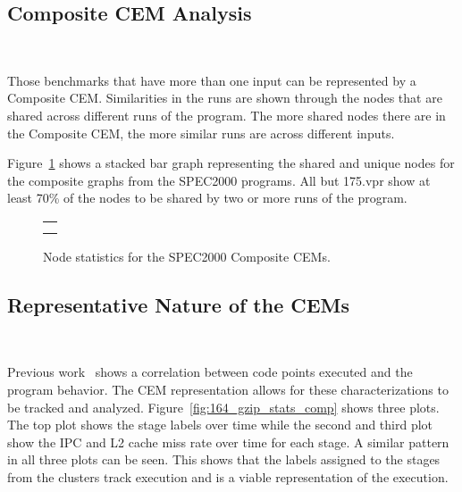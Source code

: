 \subsection{Composite CEM Analysis}~\label{sec:meth_composite_cem}

Those benchmarks that have more than one input can be represented by a
Composite CEM. Similarities in the runs are shown through the nodes
that are shared across different runs of the program. The more
shared nodes there are in the Composite CEM, the more similar runs are
across different inputs.

Figure~\ref{fig:2000_composite_nodes} shows a stacked bar graph
representing the shared and unique nodes for the composite graphs from
the SPEC2000 programs.  All but 175.vpr show at least 70\% of the
nodes to be shared by two or more runs of the program.

\begin{figure}[ht!]
    \begin{tabular}{c}
        \begin{minipage}{\textwidth}
            \centering
            \texttt{[image: fig/spec2000\_composite\_nodes]} \\
        \end{minipage} \\
    \end{tabular}
    \caption{Node statistics for the SPEC2000 Composite CEMs.}
\label{fig:2000_composite_nodes}
\end{figure}

\subsection{Representative Nature of the CEMs}~\label{sec:meth_cem_representation}

Previous work~\cite{simpoint-3} shows a correlation between code points
executed and the program behavior.  The CEM
representation allows for these characterizations to be tracked and
analyzed.  Figure~\ref{fig:164_gzip_stats_comp} shows three plots. The
top plot shows the stage labels over time while the second and third
plot show the IPC and L2 cache miss rate over time for each stage.  A
similar pattern in all three plots can be seen. This shows that the
labels assigned to the stages from the clusters track execution and is
a viable representation of the execution.

